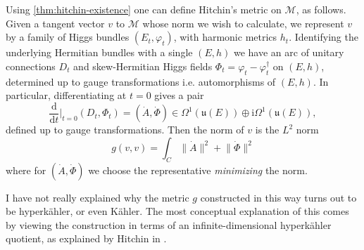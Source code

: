 \documentclass[12pt,letterpaper,reqno]{article}
\numberwithin{equation}{section}
\newcommand{\fu}{{\mathfrak u}}
\newcommand{\cM}{\ensuremath{\mathcal M}}
\newcommand{\kahler}{K\"ahler\xspace}
\newcommand{\hk}{hyperk\"ahler\xspace}
\newcommand{\Hk}{Hyperk\"ahler\xspace}
\newcommand{\I}{{\mathrm i}}
\newcommand{\de}{\mathrm{d}}
\newcommand{\norm}[1]{\lVert#1\rVert}
\newcommand{\ti}[1]{\textit{#1}}
\newcommand{\fixme}[1]{{\color{orange}{[#1]}}}
\begin{document}
Using \autoref{thm:hitchin-existence}
one can define Hitchin's metric on $\cM$, as follows.
Given a tangent vector $v$ to $\cM$ whose norm we wish to calculate, we represent $v$ by a family of Higgs bundles
$(E_t,\varphi_t)$, with harmonic metrics $h_t$.
Identifying the underlying Hermitian bundles with a single $(E,h)$
we have an arc of unitary connections $D_t$ and skew-Hermitian 
Higgs fields $\Phi_t = \varphi_t - \varphi_t^\dagger$ 
on $(E,h)$, determined up to gauge transformations i.e. 
automorphisms of $(E,h)$.
In particular, differentiating at $t = 0$ gives a pair
\begin{equation}
\frac{\de}{\de t}\Bigg\rvert_{t=0} (D_t, \Phi_t) = 
(\dot A, \dot \Phi) \in \Omega^1(\fu(E)) \oplus \I \Omega^{1}(\fu(E)),
\end{equation}
defined up to gauge transformations.
Then the norm of $v$ is the $L^2$ norm
\begin{equation}
  g(v,v) = \int_C \norm{\dot A}^2 + \norm{\dot \Phi}^2
\end{equation}
where for $(\dot A, \dot \Phi)$ we choose the representative
\ti{minimizing} the norm.

\fixme{ref Konno}

\begin{remark}[\Hk quotient] I have not really explained
why the metric $g$ constructed in this way turns out to 
be \hk, or even \kahler. The most conceptual explanation
of this comes by viewing the construction in terms of 
an infinite-dimensional \hk quotient, as explained by
Hitchin in \cite{MR89a:32021}.
\end{remark}

\end{document}
